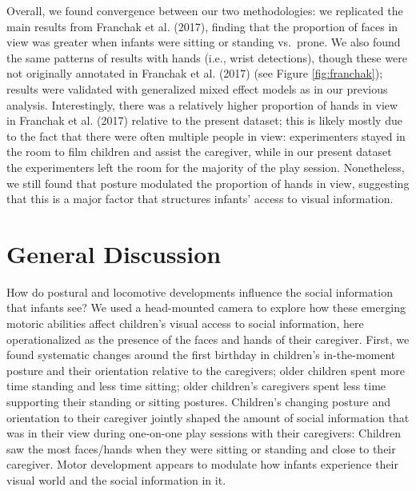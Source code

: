 \documentclass[english,man]{apa6}
\begin{document}
Overall, we found convergence between our two methodologies: we
replicated the main results from Franchak et al. (2017), finding that
the proportion of faces in view was greater when infants were sitting or
standing vs.~prone. We also found the same patterns of results with
hands (i.e., wrist detections), though these were not originally
annotated in Franchak et al. (2017) (see Figure \ref{fig:franchak});
results were validated with generalized mixed effect models as in our
previous analysis. Interestingly, there was a relatively higher
proportion of hands in view in Franchak et al. (2017) relative to the
present dataset; this is likely mostly due to the fact that there were
often multiple people in view: experimenters stayed in the room to film
children and assist the caregiver, while in our present dataset the
experimenters left the room for the majority of the play session.
Nonetheless, we still found that posture modulated the proportion of
hands in view, suggesting that this is a major factor that structures
infants' access to visual information.

\section{General Discussion}\label{general-discussion}

How do postural and locomotive developments influence the social
information that infants see? We used a head-mounted camera to explore
how these emerging motoric abilities affect children's visual access to
social information, here operationalized as the presence of the faces
and hands of their caregiver. First, we found systematic changes around
the first birthday in children's in-the-moment posture and their
orientation relative to the caregivers; older children spent more time
standing and less time sitting; older children's caregivers spent less
time supporting their standing or sitting postures. Children's changing
posture and orientation to their caregiver jointly shaped the amount of
social information that was in their view during one-on-one play
sessions with their caregivers: Children saw the most faces/hands when
they were sitting or standing and close to their caregiver. Motor
development appears to modulate how infants experience their visual
world and the social information in it.
\end{document}
